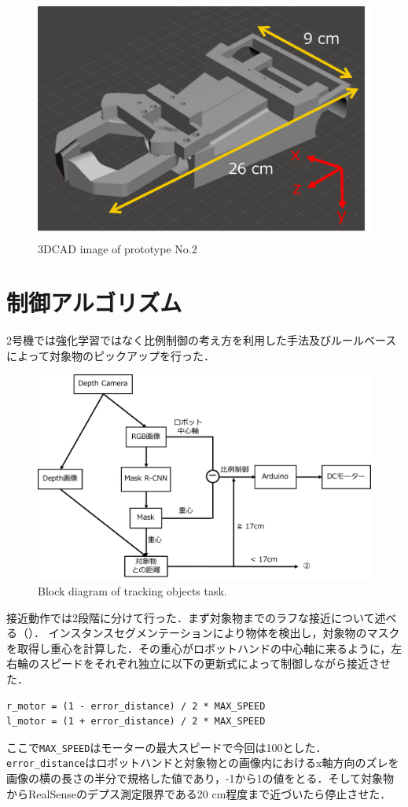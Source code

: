 \begin{figure}
    \centering
    \includegraphics[width=\linewidth]{figure/chapter4/2号機CAD}
    \caption{3DCAD image of prototype No.2}
    \label{fig:2号機CAD}
\end{figure}


\section{制御アルゴリズム}
2号機では強化学習ではなく比例制御の考え方を利用した手法及びルールベースによって対象物のピックアップを行った．

\begin{figure}
    \centering
    \includegraphics[width=0.7\linewidth]{figure/chapter4/2号機制御図_接近}
    \caption{Block diagram of tracking objects task.}
    \label{fig:2号機接近}
\end{figure}


接近動作では2段階に分けて行った．まず対象物までのラフな接近について述べる（）．
インスタンスセグメンテーションにより物体を検出し，対象物のマスクを取得し重心を計算した．その重心がロボットハンドの中心軸に来るように，左右輪のスピードをそれぞれ独立に以下の更新式によって制御しながら接近させた．
\begin{lstlisting}[caption=接近アルゴリズム, label=code:motor]
r_motor = (1 - error_distance) / 2 * MAX_SPEED
l_motor = (1 + error_distance) / 2 * MAX_SPEED
\end{lstlisting}
ここで\texttt{MAX\_SPEED}はモーターの最大スピードで今回は100とした．\texttt{error\_distance}はロボットハンドと対象物との画像内におけるx軸方向のズレを画像の横の長さの半分で規格した値であり，-1から1の値をとる．そして対象物からRealSenseのデプス測定限界である20 cm程度まで近づいたら停止させた．

